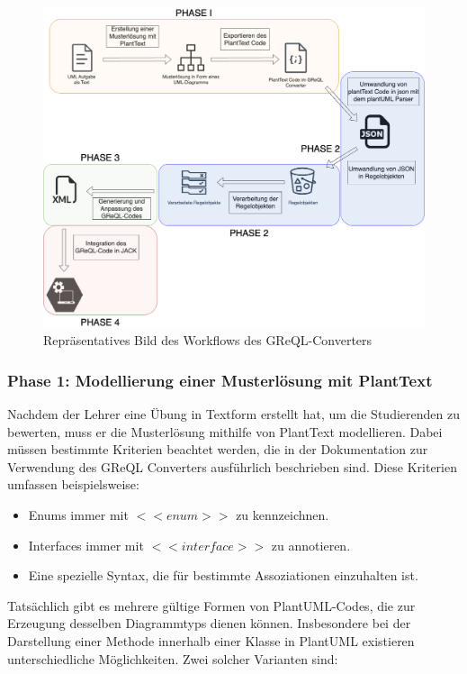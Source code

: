 \begin{figure}
    \centering
    \includegraphics[width=13cm]{images/workflow}
    \caption{Repräsentatives Bild des Workflows des GReQL-Converters}
    \label{fig:workflow}
\end{figure}

\subsubsection{Phase 1: Modellierung einer Musterlösung mit PlantText}

Nachdem der Lehrer eine Übung in Textform erstellt hat, um die Studierenden zu bewerten, muss er die Musterlösung
mithilfe von PlantText modellieren. Dabei müssen bestimmte Kriterien beachtet werden, die in der Dokumentation zur 
Verwendung des \gls{GReQL Converter}s ausführlich beschrieben sind. Diese Kriterien umfassen beispielsweise:

\begin{itemize}
    \item Enums immer mit $<<enum>>$ zu kennzeichnen.
    \item Interfaces immer mit $<<interface>>$ zu annotieren.
    \item Eine spezielle Syntax, die für bestimmte Assoziationen einzuhalten ist.
\end{itemize}

Tatsächlich gibt es mehrere gültige Formen von PlantUML-Codes, die zur Erzeugung desselben Diagrammtyps dienen können.
Insbesondere bei der Darstellung einer Methode innerhalb einer Klasse in PlantUML existieren unterschiedliche
Möglichkeiten. Zwei solcher Varianten sind:

